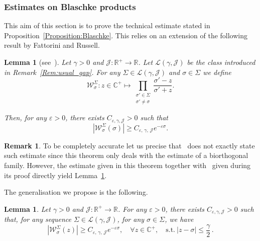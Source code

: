 \documentclass[11pt]{article}
\newtheorem{lemm}[theo]{Lemma}
\theoremstyle{definition}
\newtheorem{rema}[theo]{Remark}
\numberwithin{equation}{section}
\numberwithin{figure}{section}
\numberwithin{table}{section}
\newcommand{\LL}{\mathcal{L}}
\newcommand{\R}{\mathbb{R}}
\newcommand{\C}{\mathbb{C}}
\let\oldforall\forall
\renewcommand*{\forall}{\mathrel{\oldforall}}
\begin{document}
\subsubsection{Estimates on Blaschke products} \label{Subsec:Blaschke}

This aim of this section is to prove the technical estimate stated in Proposition~\ref{Proposition:Blaschke}. This relies on an extension of the following result by Fattorini and Russell.
\begin{lemm}[{see~\cite[Theorem~1.1]{FattoriniRussell74}}] \label{Lem:FattoriniRussell74}
Let $\gamma >0$ and $\mathcal{J} : \R^+ \to \R$. Let $\LL(\gamma, \mathcal{J})$ be the class introduced in Remark~\ref{Rem:usual_gap}. For any $\Sigma \in \mathcal{L}(\gamma, \mathcal{J})$ and $\sigma \in \Sigma$ we define
\[
\mathcal{W}^\Sigma_{\sigma} : z \in \C^+ \mapsto \prod_{\substack{\sigma' \in \Sigma\\ \sigma' \neq \sigma}} \frac{\sigma'-z}{\sigma'+z}.
\]

Then, for any $\varepsilon>0$, there exists $C_{\varepsilon,\gamma, \mathcal{J}}>0$ such that
\[
\left| \mathcal{W}^{\Sigma}_{\sigma}(\sigma) \right| \geq C_{\varepsilon,\,\gamma,\, \mathcal{J}} e^{-\varepsilon \sigma}.
\]
\end{lemm}

\begin{rema}
To be completely accurate let us precise that~\cite[Theorem~1.1]{FattoriniRussell74} does not exactly state such estimate since this theorem only deals with the estimate of a biorthogonal family. However, the estimate given in this theorem together with~\cite[equality (2.1)]{FattoriniRussell74} given during its proof directly yield Lemma~\ref{Lem:FattoriniRussell74}.
\end{rema}


The generalisation we propose is the following.

\begin{lemm} \label{Lemme:ExtensionFattoriniRussell74}
Let $\gamma >0$ and $\mathcal{J} : \R^+ \to \R$. For any $\varepsilon>0$, there exists $C_{\varepsilon, \gamma, \mathcal{J}}>0$ such that, for any sequence $\Sigma \in \mathcal{L}(\gamma, \mathcal{J})$, for any $\sigma \in \Sigma$, we have
\[
\left| \mathcal{W}^{\Sigma}_{\sigma}(z) \right| \geq C_{\varepsilon,\,\gamma,\, \mathcal{J}} e^{-\varepsilon \sigma},\quad \forall z\in \C^+,\quad\text{s.t.} \ |z-\sigma| \leq \frac{\gamma}{2}\,.
\]
\end{lemm}
\end{document}
